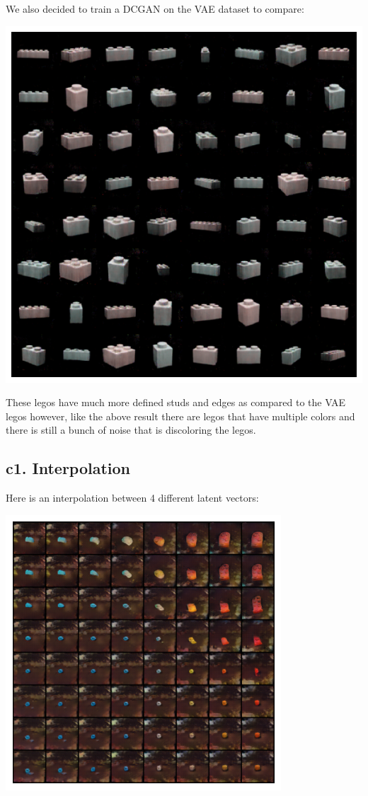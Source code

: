 \documentclass[]{article}
\begin{document}
\newpage
\noindent We also decided to train a DCGAN on the VAE dataset to compare:
\begin{center}
\includegraphics[scale=0.75]{./imgs/gan_vae}
\end{center}
These legos have much more defined studs and edges as compared to the VAE legos however, like the above result there are legos that have multiple colors and there is still a bunch
of noise that is discoloring the legos.


\newpage


\subsection*{c1. Interpolation}
Here is an interpolation between 4 different latent vectors:
\begin{center}
\includegraphics[scale=1.2]{./imgs/gan_interp_aug}
\end{center}
\end{document}

